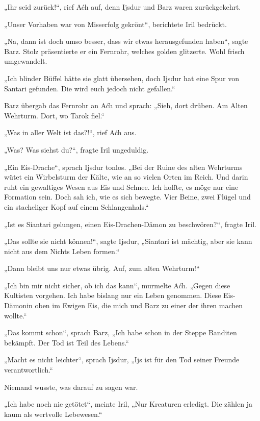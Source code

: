 „Ihr seid zurück!“, rief Aćh auf, denn Ijsdur und Barz waren zurückgekehrt.

„Unser Vorhaben war von Misserfolg gekrönt“, berichtete Iril bedrückt.

„Na, dann ist doch umso besser, dass wir etwas herausgefunden haben“, sagte Barz. Stolz präsentierte er ein Fernrohr, welches golden glitzerte. Wohl frisch umgewandelt.

„Ich blinder Büffel hätte sie glatt übersehen, doch Ijsdur hat eine Spur von Santari gefunden. Die wird euch jedoch nicht gefallen.“

Barz übergab das Fernrohr an Aćh und sprach: „Sieh, dort drüben. Am Alten Wehrturm. Dort, wo Tarok fiel.“

„Was in aller Welt ist das?!“, rief Aćh aus.

„Was? Was siehst du?“, fragte Iril ungeduldig.

„Ein Eis-Drache“, sprach Ijsdur tonlos. „Bei der Ruine des alten Wehrturms wütet ein Wirbelsturm der Kälte, wie an so vielen Orten im Reich. Und darin ruht ein gewaltiges Wesen aus Eis und Schnee. Ich hoffte, es möge nur eine Formation sein. Doch sah ich, wie es sich bewegte. Vier Beine, zwei Flügel und ein stacheliger Kopf auf einem Schlangenhals.“

„Ist es Siantari gelungen, einen Eis-Drachen-Dämon zu beschwören?“, fragte Iril.

„Das sollte sie nicht können!“, sagte Ijsdur, „Siantari ist mächtig, aber sie kann nicht aus dem Nichts Leben formen.“

„Dann bleibt uns nur etwas übrig. Auf, zum alten Wehrturm!“



\trennzeichen



„Ich bin mir nicht sicher, ob ich das kann“, murmelte Aćh. „Gegen diese Kultisten vorgehen. Ich habe bislang nur ein Leben genommen. Diese Eis-Dämonin oben im Ewigen Eis, die mich und Barz zu einer der ihren machen wollte.“

„Das kommt schon“, sprach Barz, „Ich habe schon in der Steppe Banditen bekämpft. Der Tod ist Teil des Lebens.“

„Macht es nicht leichter“, sprach Ijsdur, „Ijs ist für den Tod seiner Freunde verantwortlich.“

Niemand wusste, was darauf zu sagen war.

„Ich habe noch nie getötet“, meinte Iril, „Nur Kreaturen erledigt. Die zählen ja kaum als wertvolle Lebewesen.“

